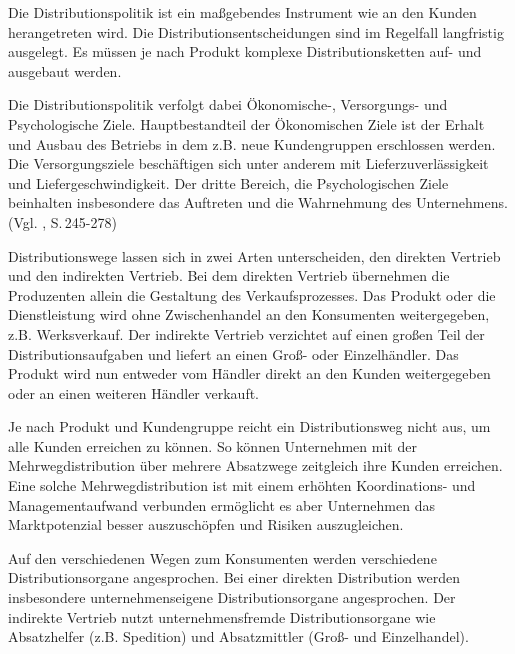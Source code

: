         \noindent
        Die Distributionspolitik ist ein maßgebendes Instrument wie an den Kunden herangetreten wird. Die
        Distributionsentscheidungen sind im Regelfall langfristig ausgelegt. Es müssen je nach Produkt komplexe
        Distributionsketten auf- und ausgebaut werden.
    
        \noindent
        Die Distributionspolitik verfolgt dabei Ökonomische-, Versorgungs- und Psychologische Ziele. Hauptbestandteil der
        Ökonomischen Ziele ist der Erhalt und Ausbau des Betriebs in dem z.B. neue Kundengruppen erschlossen werden. Die
        Versorgungsziele beschäftigen sich unter anderem mit Lieferzuverlässigkeit und Liefergeschwindigkeit. Der dritte
        Bereich, die Psychologischen Ziele beinhalten insbesondere das Auftreten und die Wahrnehmung des Unternehmens.
        (Vgl. \cite{Bruhn2014}, S.\,245-278)
    
        \noindent
        Distributionswege lassen sich in zwei Arten unterscheiden, den direkten Vertrieb und den indirekten Vertrieb. Bei
        dem direkten Vertrieb übernehmen die Produzenten allein die Gestaltung des Verkaufsprozesses. Das Produkt oder die
        Dienstleistung wird ohne Zwischenhandel an den Konsumenten weitergegeben, z.B. Werksverkauf. Der indirekte Vertrieb
        verzichtet auf einen großen Teil der Distributionsaufgaben und liefert an einen Groß- oder Einzelhändler. Das
        Produkt wird nun entweder vom Händler direkt an den Kunden weitergegeben oder an einen weiteren Händler verkauft.
    
        \noindent
        Je nach Produkt und Kundengruppe reicht ein Distributionsweg nicht aus, um alle Kunden erreichen zu können. So
        können Unternehmen mit der Mehrwegdistribution über mehrere Absatzwege zeitgleich ihre Kunden erreichen. Eine solche
        Mehrwegdistribution ist mit einem erhöhten Koordinations- und Managementaufwand verbunden ermöglicht es aber
        Unternehmen das Marktpotenzial besser auszuschöpfen und Risiken auszugleichen.
    
        \noindent
        Auf den verschiedenen Wegen zum Konsumenten werden verschiedene Distributionsorgane angesprochen. Bei einer direkten
        Distribution werden insbesondere unternehmenseigene Distributionsorgane angesprochen. Der indirekte Vertrieb nutzt
        unternehmensfremde Distributionsorgane wie Absatzhelfer (z.B. Spedition) und Absatzmittler (Groß- und Einzelhandel).

